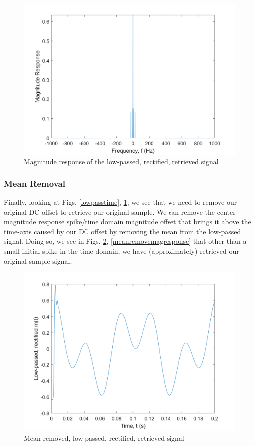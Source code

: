 \documentclass[journal]{IEEEtran}
\begin{document}
\begin{figure}[ht]
	\centering
  \includegraphics[width=\columnwidth]{LowPassMag.png}
    \caption{Magnitude response of the low-passed, rectified, retrieved signal}   
    \label{lowpassmagresponse}
\end{figure}

\subsubsection{Mean Removal}
Finally, looking at Figs. \ref{lowpasstime}, \ref{lowpassmagresponse}, we see that we need to remove our original DC offset to retrieve our original sample. We can remove the center magnitude response spike/time domain magnitude offset that brings it above the time-axis caused by our DC offset by removing the mean from the low-passed signal. Doing so, we see in Figs. \ref{meanremovetime}, \ref{meanremovemagresponse} that other than a small initial spike in the time domain, we have (approximately) retrieved our original sample signal.

\begin{figure}[ht]
	\centering
 \includegraphics[width=\columnwidth]{meanremovedtime.png}
    \caption{Mean-removed, low-passed, rectified, retrieved signal}
    \label{meanremovetime}
\end{figure}
\end{document}
